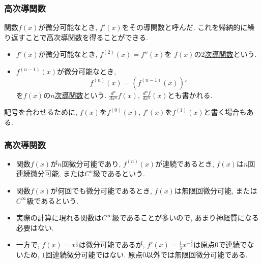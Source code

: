 \begin{frame}
\frametitle{高次導関数}


関数$f(x)$が微分可能なとき, $f'(x)$をその導関数と呼んだ. 
これを帰納的に繰り返すことで高次導関数を得ることができる. 
\begin{Def}
\begin{itemize}
\item $f'(x)$が微分可能なとき, $f^{(2)}(x)=f''(x)$を $f(x)$の\underline{$2$次導関数}という. 
\item $f^{(n-1)}(x)$が微分可能なとき, 
$$
f^{(n)}(x)=(f^{(n-1)}(x))'
$$
を$f(x)$の\underline{$n$次導関数}という. $\frac{d^n}{dx^n}f(x)$, $\frac{d^nf}{dx^n}(x)$とも書かれる.  
\end{itemize}
\end{Def}

記号を合わせるために, $f(x)$を$f^{(0)}(x)$, $f'(x)$を$f^{(1)}(x)$と書く場合もある.  


\end{frame}







\begin{frame}
\frametitle{高次導関数}


\begin{Def}
\begin{itemize}
\item 関数$f(x)$が$n$回微分可能であり, $f^{(n)}(x)$が連続であるとき, $f(x)$は$n$回連続微分可能, または$C^n$級であるという. 
\item 関数$f(x)$が何回でも微分可能であるとき, $f(x)$は無限回微分可能, または$C^\infty$級であるという. 
\end{itemize}
\end{Def}

\begin{itemize}
\item 実際の計算に現れる関数は$C^\infty$級であることが多いので, あまり神経質になる必要はない. 
\item 一方で, $f(x)=x^{\frac{1}{3}}$は微分可能であるが, $f'(x)=\frac{1}{3}x^{-\frac{2}{3}}$は原点$0$で連続でないため, $1$回連続微分可能ではない. 
原点$0$以外では無限回微分可能である. 
\end{itemize}

\end{frame}




